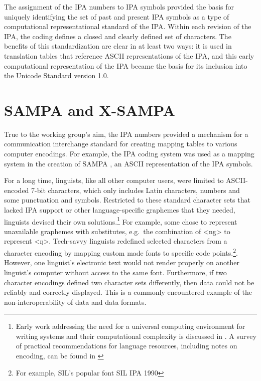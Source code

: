 The assignment of the IPA numbers to IPA symbols provided the basis for 
uniquely identifying the set of past and present IPA symbols as a type of 
computational representational standard of the IPA. Within each revision 
of the IPA, the coding defines a closed and clearly defined set of characters. 
The benefits of this standardization are clear in at least two ways: it is 
used in translation tables that reference ASCII representations of the IPA, 
and this early computational representation of the IPA became the basis for 
its inclusion into the Unicode Standard version 1.0.

\section{SAMPA and X-SAMPA}

True to the working group's aim, the IPA numbers provided a mechanism for 
a communication interchange standard for creating mapping tables to various 
computer encodings. For example, the IPA coding system was used as a mapping 
system in the creation of SAMPA \citep{Wells_etal1992}, an ASCII representation 
of the IPA symbols. 

For a long time, linguists, like all other computer users, were
limited to ASCII-encoded 7-bit characters, which only includes Latin characters,
numbers and some punctuation and symbols. Restricted to these standard character
sets that lacked IPA support or other language-specific graphemes that they
needed, linguists devised their own solutions.\footnote{Early work addressing
the need for a universal computing environment for writing systems and their
computational complexity is discussed in \citet{Simons1989}. A survey of
practical recommendations for language resources, including notes on encoding,
can be found in \citet{BirdSimons2003}} For example, some chose to represent
unavailable graphemes with substitutes, e.g.~the combination of <ng> to
represent <ŋ>. Tech-savvy linguists redefined selected characters from a
character encoding by mapping custom made fonts to specific code points.\footnote{For 
example, SIL's popular font SIL IPA 1990}. However,
one linguist's electronic text would not render properly on another linguist's
computer without access to the same font. Furthermore, if two character encodings
defined two character sets differently, then data could not be reliably and
correctly displayed. This is a commonly encountered example of the non-interoperability of
data and data formats.

